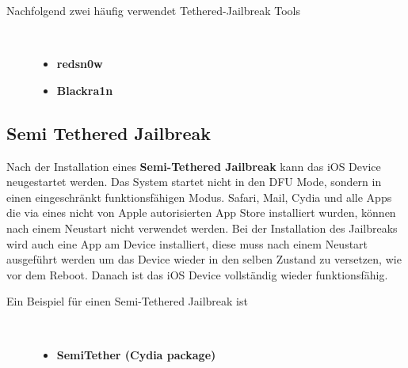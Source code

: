 \begin{description}
    \item[Nachfolgend zwei häufig verwendet Tethered-Jailbreak Tools]~\par
	\begin{itemize}
            \item \textbf{redsn0w}
            \item \textbf{Blackra1n}
    \end{itemize}
\end{description} 

\subsection{Semi Tethered Jailbreak}
\label{sec:JBSemiTethered}

Nach der Installation eines \textbf{Semi-Tethered Jailbreak} kann das iOS Device neugestartet werden. Das System startet nicht in den DFU Mode, sondern in einen eingeschränkt funktionsfähigen Modus. Safari, Mail, Cydia und alle Apps die via eines nicht von Apple autorisierten App Store installiert wurden, können nach einem Neustart nicht verwendet werden. Bei der Installation des Jailbreaks wird auch eine App am Device installiert, diese muss nach einem Neustart ausgeführt werden um das Device wieder in den selben Zustand zu versetzen, wie vor dem Reboot. Danach ist das iOS Device vollständig wieder funktionsfähig.

\begin{description}
    \item[Ein Beispiel für einen Semi-Tethered Jailbreak ist]~\par
	\begin{itemize}
        \item \textbf{SemiTether (Cydia package)}
    \end{itemize}
\end{description} 

